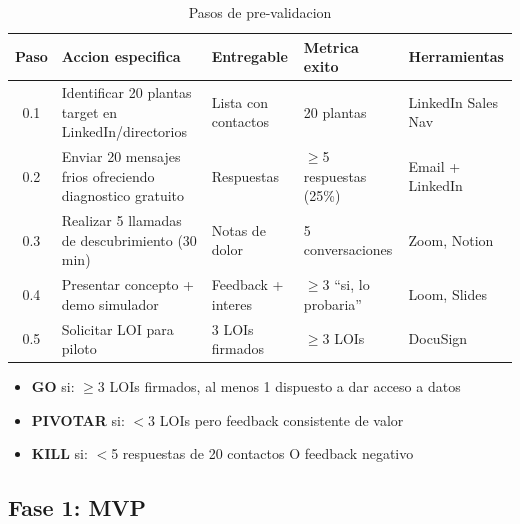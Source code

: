 \documentclass[11pt,a4paper]{article}
\newcommand{\semverde}{\textcolor{verde}{\ding{108}}}
\newcommand{\semamarillo}{\textcolor{amarillo}{\ding{108}}}
\newcommand{\semrojo}{\textcolor{rojo}{\ding{108}}}
\begin{document}
\begin{table}[h]
\centering
\small
\begin{tabular}{c p{4.5cm} p{3cm} p{2.5cm} p{2cm}}
\toprule
\textbf{Paso} & \textbf{Accion especifica} & \textbf{Entregable} & \textbf{Metrica exito} & \textbf{Herramientas} \\
\midrule
0.1 & Identificar 20 plantas target en LinkedIn/directorios & Lista con contactos & 20 plantas & LinkedIn Sales Nav \\
0.2 & Enviar 20 mensajes frios ofreciendo diagnostico gratuito & Respuestas & $\geq$5 respuestas (25\%) & Email + LinkedIn \\
0.3 & Realizar 5 llamadas de descubrimiento (30 min) & Notas de dolor & 5 conversaciones & Zoom, Notion \\
0.4 & Presentar concepto + demo simulador & Feedback + interes & $\geq$3 ``si, lo probaria'' & Loom, Slides \\
0.5 & Solicitar LOI para piloto & 3 LOIs firmados & $\geq$3 LOIs & DocuSign \\
\bottomrule
\end{tabular}
\caption{Pasos de pre-validacion}
\end{table}

\begin{veredictobox}
\begin{itemize}[leftmargin=*]
    \item[\semverde] \textbf{GO} si: $\geq$3 LOIs firmados, al menos 1 dispuesto a dar acceso a datos
    \item[\semamarillo] \textbf{PIVOTAR} si: $<$3 LOIs pero feedback consistente de valor
    \item[\semrojo] \textbf{KILL} si: $<$5 respuestas de 20 contactos O feedback negativo
\end{itemize}
\end{veredictobox}

\subsection{Fase 1: MVP}
\end{document}
